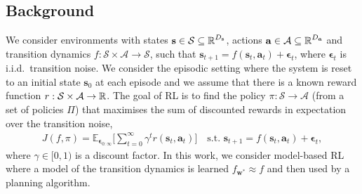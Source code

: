 \documentclass{article}
\newcommand{\state}{\ensuremath{\mathbf{s}}}
\newcommand{\action}{\ensuremath{\mathbf{a}}}
\newcommand{\noise}{\ensuremath{\bm\epsilon}}
\newcommand{\discount}{\ensuremath{\gamma}}
\newcommand{\stateDomain}{\ensuremath{\mathcal{S}}}
\newcommand{\actionDomain}{\ensuremath{\mathcal{A}}}
\newcommand{\policyDomain}{\ensuremath{\Pi}}
\newcommand{\rewardFn}{\ensuremath{r}}
\newcommand{\transitionFn}{\ensuremath{f}}
\newcommand{\policy}{\ensuremath{\pi}}
\begin{document}
\subsection{Background}
We consider environments with states \(\state \in \stateDomain \subseteq \R^{D_{\state}} \),
actions \(\action \in \actionDomain \subseteq \R^{D_{\action}}\) and transition dynamics
\(\transitionFn: \stateDomain \times \actionDomain \rightarrow \stateDomain \), such that
$\state_{t+1} = \transitionFn(\state_{t}, \action_{t}) + \noise_{t}$, where  $\noise_{t}$
is i.i.d.\ transition noise.
We consider the episodic setting where the system is reset to an initial state $\state_{0}$ at each episode and we
assume that there is a known reward function $r : \stateDomain \times \actionDomain \rightarrow \R$.
The goal of RL is to find the policy \(\pi : \stateDomain \rightarrow \actionDomain\)
(from a set of policies $\Pi$) that maximises the sum of discounted rewards
in expectation over the transition noise,
\begin{align} \label{eq-model-free-objective}
J(\transitionFn, \policy) = \mathbb{E}_{\noise_{0:\infty}} \bigg[ \sum_{t=0}^{\infty} \discount^{t} \rewardFn(\state_{t},\action_{t}) \bigg]
\quad \text{s.t. } \state_{t+1} = \transitionFn(\state_{t}, \action_{t}) + \noise_{t},
\end{align}
where $\gamma \in [0, 1)$ is a discount factor.
In this work, we consider model-based RL where a model of the transition dynamics is learned \(f_{\mathbf{w}^{*}} \approx \transitionFn\) and then used by a planning algorithm.
\end{document}
